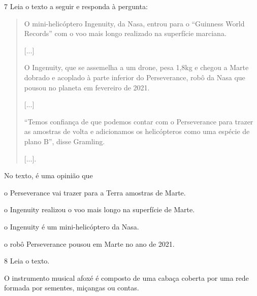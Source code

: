 \num{7} Leia o texto a seguir e responda à pergunta:

\begin{quote}
O mini-helicóptero Ingenuity, da Nasa, entrou para o “Guinness World
Records” com o voo mais longo realizado na superfície marciana.

{[}...{]}

O Ingenuity, que se assemelha a um drone, pesa 1,8kg e chegou a Marte
dobrado e acoplado à parte inferior do Perseverance, robô da Nasa que
pousou no planeta em fevereiro de 2021.

{[}...{]}

“Temos confiança de que podemos contar com o Perseverance para trazer
as amostras de volta e adicionamos os helicópteros como uma espécie de
plano B”, disse Gramling.

{[}...{]}.

\end{quote}

No texto, é uma opinião que

\begin{escolha}
\item o Perseverance vai trazer para a Terra amostras de Marte.

\item o Ingenuity realizou o voo mais longo na superfície de Marte.

\item o Ingenuity é um mini-helicóptero da Nasa.

\item o robô Perseverance pousou em Marte no ano de 2021.
\end{escolha}


\num{8}  Leia o texto.

O instrumento musical afoxé é composto de uma cabaça coberta por uma
rede formada por sementes, miçangas ou contas.



